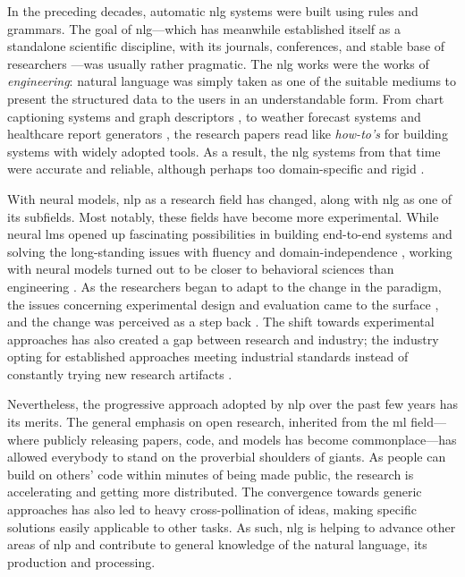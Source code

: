 In the preceding decades, automatic \ac{nlg} systems were built using rules and grammars. The goal of \ac{nlg}---which has meanwhile established itself as a standalone scientific discipline, with its journals, conferences, and stable base of researchers \cite{ACLanthologySIGGEN}---was usually rather pragmatic.
The \ac{nlg} works were the works of \emph{engineering}: natural language was simply taken as one of the suitable mediums to present the structured data to the users in an understandable form. From chart captioning systems \cite{mittalDescribingComplexCharts1998} and graph descriptors \cite{sunDomainIndependentSentence2006}, to weather forecast systems \cite{belzAutomaticGenerationWeather2008} and healthcare report generators \cite{portetAutomaticGenerationTextual2009}, the research papers read like \emph{how-to's} for building systems with widely adopted tools. As a result, the \ac{nlg} systems from that time were accurate and reliable, although perhaps too domain-specific and rigid \cite{reiterBuildingAppliedNatural1997,gattSurveyStateArt2018}.


With neural models, \ac{nlp} as a research field has changed, along with \ac{nlg} as one of its subfields. Most notably, these fields have become more experimental. While neural \acp{lm} opened up fascinating possibilities in building end-to-end systems and solving the long-standing issues with fluency and domain-independence \cite{ferreiraNeuralDatatotextGeneration2019,dusekEvaluatingStateoftheartEndtoEnd2020,sharmaInnovationsNeuralDatatotext2022}, working with neural models turned out to be closer to behavioral sciences than engineering \cite{holtzmanGenerativeModelsComplex2023}. As the researchers began to adapt to the change in the paradigm, the issues concerning experimental design and evaluation came to the surface \cite{gehrmannRepairingCrackedFoundation2022}, and the change was perceived as a step back \cite{reiter2020academic}. The shift towards experimental approaches has also created a gap between research and industry; the industry opting for established approaches meeting industrial standards instead of constantly trying new research artifacts \cite{daleNaturalLanguageGeneration2020,daleNavigatingTextGeneration2023}.


Nevertheless, the progressive approach adopted by \ac{nlp} over the past few years has its merits. The general emphasis on open research, inherited from the \ac{ml} field---where publicly releasing papers, code, and models has become commonplace---has allowed everybody to stand on the proverbial shoulders of giants. As people can build on others' code within minutes of being made public, the research is accelerating and getting more distributed. The convergence towards generic approaches has also led to heavy cross-pollination of ideas, making specific solutions easily applicable to other tasks. As such, \ac{nlg} is helping to advance other areas of \ac{nlp} and contribute to general knowledge of the natural language, its production and processing.

